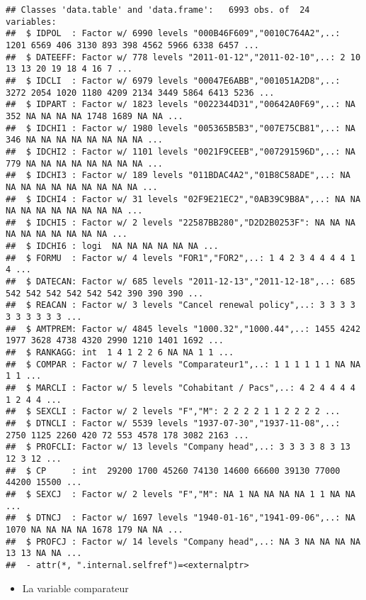 \documentclass[
]{article}
\providecommand{\tightlist}{%
  \setlength{\itemsep}{0pt}\setlength{\parskip}{0pt}}
\begin{document}
\begin{verbatim}
## Classes 'data.table' and 'data.frame':   6993 obs. of  24 variables:
##  $ IDPOL  : Factor w/ 6990 levels "000B46F609","0010C764A2",..: 1201 6569 406 3130 893 398 4562 5966 6338 6457 ...
##  $ DATEEFF: Factor w/ 778 levels "2011-01-12","2011-02-10",..: 2 10 13 13 20 19 18 4 16 7 ...
##  $ IDCLI  : Factor w/ 6979 levels "00047E6ABB","001051A2D8",..: 3272 2054 1020 1180 4209 2134 3449 5864 6413 5236 ...
##  $ IDPART : Factor w/ 1823 levels "0022344D31","00642A0F69",..: NA 352 NA NA NA NA 1748 1689 NA NA ...
##  $ IDCHI1 : Factor w/ 1980 levels "005365B5B3","007E75CB81",..: NA 346 NA NA NA NA NA NA NA NA ...
##  $ IDCHI2 : Factor w/ 1101 levels "0021F9CEEB","007291596D",..: NA 779 NA NA NA NA NA NA NA NA ...
##  $ IDCHI3 : Factor w/ 189 levels "011BDAC4A2","01B8C58ADE",..: NA NA NA NA NA NA NA NA NA NA ...
##  $ IDCHI4 : Factor w/ 31 levels "02F9E21EC2","0AB39C9B8A",..: NA NA NA NA NA NA NA NA NA NA ...
##  $ IDCHI5 : Factor w/ 2 levels "22587BB280","D2D2B0253F": NA NA NA NA NA NA NA NA NA NA ...
##  $ IDCHI6 : logi  NA NA NA NA NA NA ...
##  $ FORMU  : Factor w/ 4 levels "FOR1","FOR2",..: 1 4 2 3 4 4 4 4 1 4 ...
##  $ DATECAN: Factor w/ 685 levels "2011-12-13","2011-12-18",..: 685 542 542 542 542 542 542 390 390 390 ...
##  $ REACAN : Factor w/ 3 levels "Cancel renewal policy",..: 3 3 3 3 3 3 3 3 3 3 ...
##  $ AMTPREM: Factor w/ 4845 levels "1000.32","1000.44",..: 1455 4242 1977 3628 4738 4320 2990 1210 1401 1692 ...
##  $ RANKAGG: int  1 4 1 2 2 6 NA NA 1 1 ...
##  $ COMPAR : Factor w/ 7 levels "Comparateur1",..: 1 1 1 1 1 1 NA NA 1 1 ...
##  $ MARCLI : Factor w/ 5 levels "Cohabitant / Pacs",..: 4 2 4 4 4 4 1 2 4 4 ...
##  $ SEXCLI : Factor w/ 2 levels "F","M": 2 2 2 2 1 1 2 2 2 2 ...
##  $ DTNCLI : Factor w/ 5539 levels "1937-07-30","1937-11-08",..: 2750 1125 2260 420 72 553 4578 178 3082 2163 ...
##  $ PROFCLI: Factor w/ 13 levels "Company head",..: 3 3 3 3 8 3 13 12 3 12 ...
##  $ CP     : int  29200 1700 45260 74130 14600 66600 39130 77000 44200 15500 ...
##  $ SEXCJ  : Factor w/ 2 levels "F","M": NA 1 NA NA NA NA 1 1 NA NA ...
##  $ DTNCJ  : Factor w/ 1697 levels "1940-01-16","1941-09-06",..: NA 1070 NA NA NA NA 1678 179 NA NA ...
##  $ PROFCJ : Factor w/ 14 levels "Company head",..: NA 3 NA NA NA NA 13 13 NA NA ...
##  - attr(*, ".internal.selfref")=<externalptr>
\end{verbatim}

\begin{itemize}
\tightlist
\item
  La variable comparateur
\end{itemize}
\end{document}
